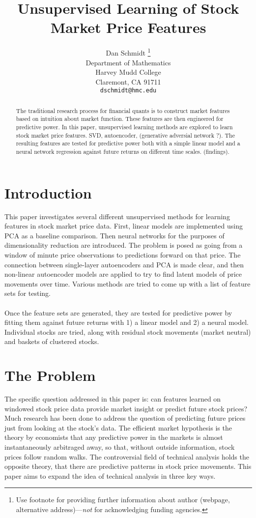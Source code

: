 \documentclass{article}
\title{Unsupervised Learning of Stock Market Price Features}
\author{
  Dan Schmidt \thanks{Use footnote for providing further
    information about author (webpage, alternative
    address)---\emph{not} for acknowledging funding agencies.} \\
  Department of Mathematics\\
  Harvey Mudd College\\
  Claremont, CA 91711 \\
  \texttt{dschmidt@hmc.edu} \\
}
\begin{document}

\maketitle

\begin{abstract}
The traditional research process for financial quants is to construct market features based on intuition about market
function. These features are then engineered for predictive power. In this paper, unsupervised learning methods are
explored to learn stock market price features. SVD, autoencoder, (generative adversial network ?). The resulting features
are tested for predictive power both with a simple linear model and a neural network regression against future returns on
different time scales. (findings). 
\end{abstract}

\section{Introduction}

This paper investigates several different unsupervised methods for learning
features in stock market price data. First, linear models are implemented
using PCA as a baseline comparison. Then neural networks for the purposes
of dimensionality reduction are introduced. The problem is posed as going
from a window of minute price observations to predictions forward on that 
price. The connection between single-layer autoencoders and PCA is made
clear, and then non-linear autoencoder models are applied to try to 
find latent models of price movements over time. Various methods
are tried to come up with a list of feature sets for testing. \\ \\
Once the feature sets are generated, they are tested for predictive
power by fitting them against future returns with 1) a linear model
and 2) a neural model. Individual stocks are tried, along with residual
stock movements (market neutral) and baskets of clustered stocks.

\section{The Problem}

The specific question addressed in this paper is: can features learned on
windowed stock price data provide market insight or predict future stock prices?
Much research has been done to address the question of predicting future prices
just from looking at the stock's data. The efficient market hypothesis is the
theory by economists that any predictive power in the markets is almost 
instantaneously arbitraged away, so that, without outside information, stock prices 
follow random walks. The controversial field of technical analysis holds the
opposite theory, that there are predictive patterns in stock price movements. This
paper aims to expand the idea of technical analysis in three key ways.
\end{document}
